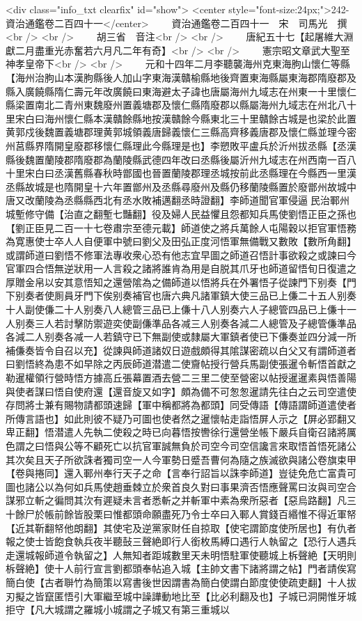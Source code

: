<div class="info_txt clearfix" id="show">
<center style="font-size:24px;">242-資治通鑑卷二百四十一</center>
  　　資治通鑑卷二百四十一　宋　司馬光　撰<br />
<br />
　　胡三省　音注<br />
<br />
　　唐紀五十七【起屠維大淵獻二月盡重光赤奮若六月凡二年有奇】<br />
<br />
　　憲宗昭文章武大聖至神孝皇帝下<br />
<br />
　　元和十四年二月李聽襲海州克東海朐山懷仁等縣【海州治朐山本漢胊縣後人加山字東海漢贛榆縣地後齊置東海縣屬東海郡隋廢郡及縣入廣饒縣隋仁壽元年改廣饒曰東海避太子諱也唐屬海州九域志在州東一十里懷仁縣梁置南北二青州東魏廢州置義塘郡及懷仁縣隋廢郡以縣屬海州九域志在州北八十里宋白曰海州懷仁縣本漢贛餘縣地按漢贛餘今縣東北三十里贛餘古城是也梁於此置黄郭戍後魏置義塘郡理黄郭城領義唐歸義懷仁三縣高齊移義唐郡及懷仁縣並理今密州莒縣界隋開皇廢郡移懷仁縣理此今縣理是也】李愬敗平盧兵於沂州拔丞縣【丞漢縣後魏置蘭陵郡隋廢郡為蘭陵縣武德四年改曰丞縣後屬沂州九域志在州西南一百八十里宋白曰丞漢舊縣春秋時鄫國也晉置蘭陵郡理丞城按前此丞縣理在今縣西一里漢丞縣故城是也隋開皇十六年置鄫州及丞縣尋廢州及縣仍移蘭陵縣置於廢鄫州故城中唐又改蘭陵為丞縣縣西北有丞水敗補邁翻丞時證翻】李師道聞官軍侵逼民治鄆州城塹修守備【治直之翻塹七豔翻】役及婦人民益懼且怨都知兵馬使劉悟正臣之孫也【劉正臣見二百一十七卷肅宗至德元載】師道使之將兵萬餘人屯陽穀以拒官軍悟務為寛惠使士卒人人自便軍中號曰劉父及田弘正度河悟軍無備戰又數敗【數所角翻】或謂師道曰劉悟不修軍法專收衆心恐有他志宜早圖之師道召悟計事欲殺之或諫曰今官軍四合悟無逆狀用一人言殺之諸將誰肯為用是自脱其爪牙也師道留悟旬日復遣之厚贈金帛以安其意悟知之還營隂為之備師道以悟將兵在外署悟子從諫門下别奏【門下别奏者使厠員牙門下俟别奏補官也唐六典凡諸軍鎮大使三品已上傔二十五人别奏十人副使傔二十人别奏八人總管三品已上傔十八人别奏六人子總管四品已上傔十一人别奏三人若討擊防禦遊奕使副傔準品各减三人别奏各減二人總管及子總管傔準品各減二人别奏各减一人若鎮守已下無副使或隸屬大軍鎮者使已下傔奏並四分減一所補傔奏皆令自召以充】從諫與師道諸奴日遊戲頗得其隂謀密疏以白父又有謂師道者曰劉悟終為患不如早除之丙辰師道潜遣二使齎帖授行營兵馬副使張暹令斬悟首獻之勒暹權領行營時悟方據高丘張幕置酒去營二三里二使至營密以帖授暹暹素與悟善陽與使者謀曰悟自使府還【還音旋又如字】頗為備不可怱怱暹請先往白之云司空遣使存問將士兼有賜物請都頭速歸【軍中稱都將為都頭】同受傳語【傳語謂師道遣使者所傳言語也】如此則彼不疑乃可圖也使者然之暹懷帖走詣悟屏人示之【屏必郢翻又卑正翻】悟潜遣人先執二使殺之時已向暮悟按轡徐行還營坐帳下嚴兵自衛召諸將厲色謂之曰悟與公等不顧死亡以抗官軍誠無負於司空今司空信讒言來取悟首悟死諸公其次矣且天子所欲誅者獨司空一人今軍勢日蹙吾曹何為隨之族滅欲與諸公卷旗束甲【卷與捲同】還入鄆州奉行天子之命【言奉行詔旨以誅李師道】豈徒免危亡富貴可圖也諸公以為何如兵馬使趙垂棘立於衆首良久對曰事果濟否悟應聲罵曰汝與司空合謀邪立斬之徧問其㳄有遲疑未言者悉斬之并斬軍中素為衆所惡者【惡烏路翻】凡三十餘尸於帳前餘皆股栗曰惟都頭命願盡死乃令士卒曰入鄆人賞錢百緡惟不得近軍帑【近其靳翻帑他朗翻】其使宅及逆黨家財任自掠取【使宅謂節度使所居也】有仇者報之使士皆飽食執兵夜半聽鼔三聲絶即行人銜枚馬縛口遇行人執留之【恐行人遇兵走還城報師道令執留之】人無知者距城數里天未明悟駐軍使聽城上柝聲絶【天明則柝聲絶】使十人前行宣言劉都頭奉帖追入城【主帥文書下諸將謂之帖】門者請俟寫簡白使【古者聨竹為簡策以寫書後世因謂書為簡白使謂白節度使使疏吏翻】十人拔刃擬之皆竄匿悟引大軍繼至城中譟譁動地比至【比必利翻及也】子城已洞開惟牙城拒守【凡大城謂之羅城小城謂之子城又有第三重城以